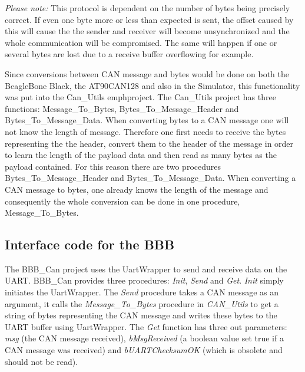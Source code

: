 \emph{Please note:} This protocol is dependent on the number of bytes being precisely correct. If even one byte more or less than expected is sent, the offset caused by this will cause the the sender and receiver will become unsynchronized and the whole communication will be compromised. The same will happen if one or several bytes are lost due to a receive buffer overflowing for example. \newline

Since conversions between CAN message and bytes would be done on both the BeagleBone Black, the AT90CAN128 and also in the Simulator, this functionality was put into the Can\_Utils emph{project}. \newline
The Can\_Utils project has three functions: Message\_To\_Bytes, Bytes\_To\_Message\_Header and Bytes\_To\_Message\_Data.  \newline
When converting bytes to a CAN message one will not know the length of message. Therefore one first needs to receive the bytes representing the the header, convert them to the header of the message in order to learn the length of the payload data and then read as many bytes as the payload contained. \newline
For this reason there are two procedures Bytes\_To\_Message\_Header and Bytes\_To\_Message\_Data.  \newline
When converting a CAN message to bytes, one already knows the length of the message and consequently the whole conversion can be done in one procedure, Message\_To\_Bytes.

\subsection{Interface code for the BBB}
The BBB\_Can project uses the UartWrapper to send and receive data on the UART. BBB\_Can provides three procedures: \emph{Init}, \emph{Send} and \emph{Get}. \newline
\emph{Init} simply initiates the UartWrapper. \newline
The \emph{Send} procedure takes a CAN message as an argument, it calls the \emph{Message\_To\_Bytes} procedure in \emph{CAN\_Utils} to get a string of bytes representing the CAN message and writes these bytes to the UART buffer using UartWrapper. \newline
The \emph{Get} function has three out parameters: \emph{msg} (the CAN message received), \emph{bMsgReceived} (a boolean value set true if a CAN message was received) and \emph{bUARTChecksumOK} (which is obsolete and should not be read). 

